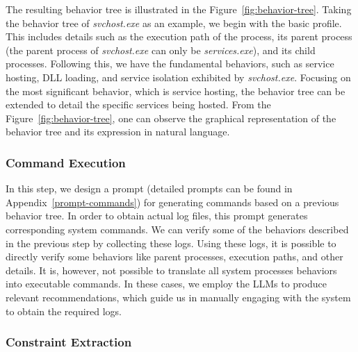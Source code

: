 The resulting behavior tree is illustrated in the Figure~\ref{fig:behavior-tree}. Taking the behavior tree of \textit{svchost.exe} as an example, we begin with the basic profile. This includes details such as the execution path of the process, its parent process (the parent process of \textit{svchost.exe} can only be \textit{services.exe}), and its child processes. Following this, we have the fundamental behaviors, such as service hosting, DLL loading, and service isolation exhibited by \textit{svchost.exe}. Focusing on the most significant behavior, which is service hosting, the behavior tree can be extended to detail the specific services being hosted. From the Figure~\ref{fig:behavior-tree}, one can observe the graphical representation of the behavior tree and its expression in natural language.




\subsubsection{Command Execution}

In this step, we design a prompt (detailed prompts can be found in Appendix~\ref{prompt-commands}) for generating commands based on a previous behavior tree. In order to obtain actual log files, this prompt generates corresponding system commands. We can verify some of the behaviors described in the previous step by collecting these logs. Using these logs, it is possible to directly verify some behaviors like parent processes, execution paths, and other details. It is, however, not possible to translate all system processes behaviors into executable commands. In these cases, we employ the LLMs to produce relevant recommendations, which guide us in manually engaging with the system to obtain the required logs.

\subsubsection{Constraint Extraction}

